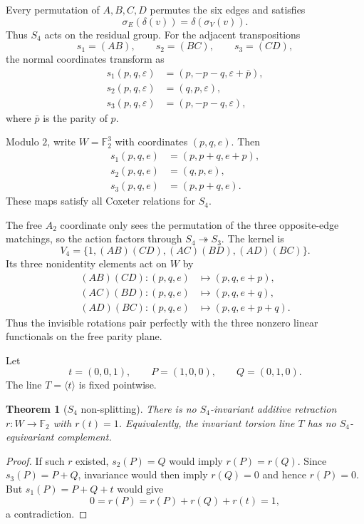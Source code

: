 \documentclass[11pt]{amsart}
\newtheorem{theorem}{Theorem}[section]
\theoremstyle{definition}
\theoremstyle{remark}
\newcommand{\F}{\mathbb F}
\begin{document}
Every permutation of $A,B,C,D$ permutes the six edges and satisfies
\[
 \sigma_E(\delta(v))=\delta(\sigma_V(v)).
\]
Thus $S_4$ acts on the residual group. For the adjacent transpositions
\[
 s_1=(AB),\qquad s_2=(BC),\qquad s_3=(CD),
\]
the normal coordinates transform as
\begin{equation}\label{eq:actions}
\begin{aligned}
 s_1(p,q,\varepsilon)&=(p,-p-q,\varepsilon+\bar p),\\
 s_2(p,q,\varepsilon)&=(q,p,\varepsilon),\\
 s_3(p,q,\varepsilon)&=(p,-p-q,\varepsilon),
\end{aligned}
\end{equation}
where $\bar p$ is the parity of $p$.

Modulo $2$, write $W=\F_2^3$ with coordinates $(p,q,e)$. Then
\begin{equation}\label{eq:mod2}
\begin{aligned}
 s_1(p,q,e)&=(p,p+q,e+p),\\
 s_2(p,q,e)&=(q,p,e),\\
 s_3(p,q,e)&=(p,p+q,e).
\end{aligned}
\end{equation}
These maps satisfy all Coxeter relations for $S_4$.

The free $A_2$ coordinate only sees the permutation of the three opposite-edge matchings, so the action factors through $S_4\twoheadrightarrow S_3$. The kernel is
\[
 V_4=\{1,(AB)(CD),(AC)(BD),(AD)(BC)\}.
\]
Its three nonidentity elements act on $W$ by
\begin{align*}
 (AB)(CD):(p,q,e)&\mapsto(p,q,e+p),\\
 (AC)(BD):(p,q,e)&\mapsto(p,q,e+q),\\
 (AD)(BC):(p,q,e)&\mapsto(p,q,e+p+q).
\end{align*}
Thus the invisible rotations pair perfectly with the three nonzero linear functionals on the free parity plane.

Let
\[
 t=(0,0,1),\qquad P=(1,0,0),\qquad Q=(0,1,0).
\]
The line $T=\langle t\rangle$ is fixed pointwise.

\begin{theorem}[$S_4$ non-splitting]\label{thm:nonsplit}
There is no $S_4$-invariant additive retraction $r:W\to\F_2$ with $r(t)=1$. Equivalently, the invariant torsion line $T$ has no $S_4$-equivariant complement.
\end{theorem}

\begin{proof}
If such $r$ existed, $s_2(P)=Q$ would imply $r(P)=r(Q)$. Since $s_3(P)=P+Q$, invariance would then imply $r(Q)=0$ and hence $r(P)=0$. But $s_1(P)=P+Q+t$ would give
\[
 0=r(P)=r(P)+r(Q)+r(t)=1,
\]
a contradiction.
\end{proof}
\end{document}
